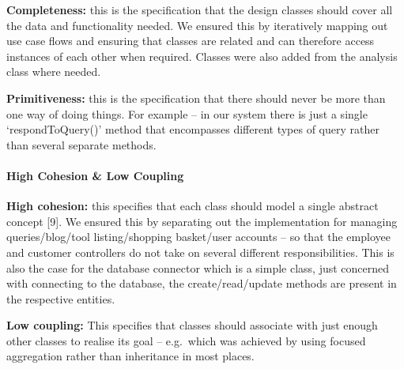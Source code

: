 \documentclass[fontsize=11pt]{extarticle}
\numberwithin{figure}{section} %
\numberwithin{table}{section}%
\let\oldparagraph\paragraph
\renewcommand{\paragraph}[1]{\oldparagraph{#1}\mbox{}}
\begin{document}
\textbf{Completeness: } this is the specification that the design
classes should cover all the data and functionality needed. We ensured
this by iteratively mapping out use case flows and ensuring that classes
are related and can therefore access instances of each other when
required. Classes were also added from the analysis class where needed.

\textbf{Primitiveness:} this is the specification that there should
never be more than one way of doing things. For example -- in our system
there is just a single `respondToQuery()' method that encompasses
different types of query rather than several separate methods.

\hypertarget{high-cohesion-low-coupling}{%
\paragraph{High Cohesion \& Low
Coupling}\label{high-cohesion-low-coupling}}

\textbf{High cohesion: } this specifies that each class should model a
single abstract concept {[}9{]}. We ensured this by separating out the
implementation for managing queries/blog/tool listing/shopping
basket/user accounts -- so that the employee and customer controllers do
not take on several different responsibilities. This is also the case
for the database connector which is a simple class, just concerned with
connecting to the database, the create/read/update methods are present
in the respective entities.

\textbf{Low coupling: }This specifies that classes should associate with
just enough other classes to realise its goal -- e.g.~which was achieved
by using focused aggregation rather than inheritance in most places.
\end{document}
